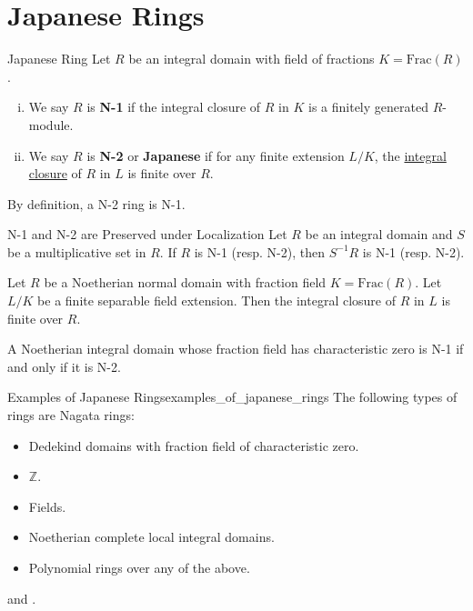 \section{Japanese Rings}
\begin{definition}{Japanese Ring}{}
    Let $R$ be an integral domain with field of fractions $K=\mathrm{Frac}(R)$.
    \begin{enumerate}[(i)]
        \item We say $R$ is \textbf{N-1} if the integral closure of $R$ in $K$ is a finitely generated $R$-module.
        \item We say $R$ is \textbf{N-2} or \textbf{Japanese} if for any finite extension $L/K$, the \hyperref[th:integral_closure]{integral closure} of $R$ in $L$ is finite over $R$.
    \end{enumerate}
\end{definition}
\begin{remark}
    By definition, a N-2 ring is N-1.
\end{remark}

\begin{proposition}{N-1 and N-2 are Preserved under Localization}{}
    Let $R$ be an integral domain and $S$ be a multiplicative set in $R$. If $R$ is N-1 (resp. N-2), then $S^{-1}R$ is N-1 (resp. N-2).
\end{proposition}

\begin{proposition}{}{}
    Let $R$ be a Noetherian normal domain with fraction field $K=\mathrm{Frac}(R)$. Let $L/K$ be a finite separable field extension. Then the integral closure of $R$ in $L$ is finite over $R$.
\end{proposition}

\begin{proposition}{}{}
    A Noetherian integral domain whose fraction field has characteristic zero is N-1 if and only if it is N-2.
\end{proposition}

\begin{example}{Examples of Japanese Rings}{examples_of_japanese_rings}
    The following types of rings are Nagata rings:
    \begin{itemize}
        \item Dedekind domains with fraction field of characteristic zero.
        \item $\mathbb{Z}$.
        \item Fields.
        \item Noetherian complete local integral domains.
        \item Polynomial rings over any of the above.
    \end{itemize}
\end{example}
\begin{prf}
     and .
\end{prf}

